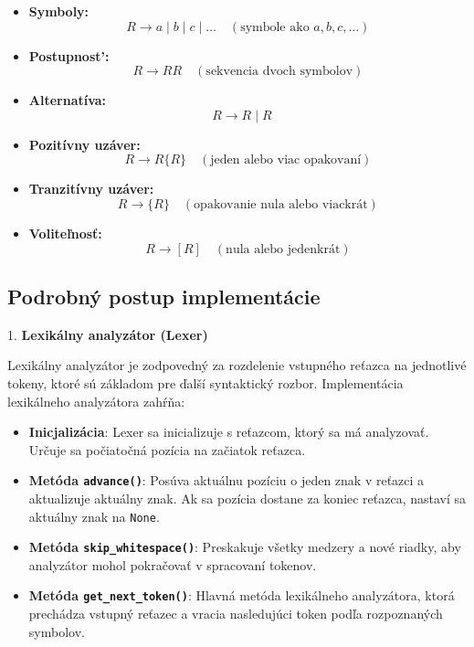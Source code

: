 \documentclass[a4paper,12pt]{article}
\begin{document}
\begin{itemize}
    \item \textbf{Symboly:} 
    \begin{equation*}
        R \rightarrow a \mid b \mid c \mid \dots \quad (\text{symbole ako } a, b, c, \dots)
    \end{equation*}
    \item \textbf{Postupnost':} 
    \begin{equation*}
        R \rightarrow R R \quad (\text{sekvencia dvoch symbolov})
    \end{equation*}
    \item \textbf{Alternatíva:} 
    \begin{equation*}
        R \rightarrow R \mid R \quad 
    \end{equation*}
    \item \textbf{Pozitívny uzáver:} 
    \begin{equation*}
        R \rightarrow R\{R\} \quad (\text{jeden alebo viac opakovaní}) 
    \end{equation*}
    \item \textbf{Tranzitívny uzáver:} 
    \begin{equation*}
        R \rightarrow \{R\} \quad (\text{opakovanie nula alebo viackrát}) 
    \end{equation*}
    \item \textbf{Voliteľnosť:}
    \begin{equation*}
        R \rightarrow [R] \quad (\text{nula alebo jedenkrát})
    \end{equation*}
\end{itemize}

\subsection{Podrobný postup implementácie}
1. \textbf{Lexikálny analyzátor (Lexer)}

Lexikálny analyzátor je zodpovedný za rozdelenie vstupného reťazca na jednotlivé tokeny, ktoré sú základom pre ďalší syntaktický rozbor. Implementácia lexikálneho analyzátora zahŕňa:

\begin{itemize}
    \item \textbf{Inicjalizácia}: Lexer sa inicializuje s reťazcom, ktorý sa má analyzovať. Určuje sa počiatočná pozícia na začiatok reťazca.
    \item \textbf{Metóda \texttt{advance()}}: Posúva aktuálnu pozíciu o jeden znak v reťazci a aktualizuje aktuálny znak. Ak sa pozícia dostane za koniec reťazca, nastaví sa aktuálny znak na \texttt{None}.
    \item \textbf{Metóda \texttt{skip\_whitespace()}}: Preskakuje všetky medzery a nové riadky, aby analyzátor mohol pokračovať v spracovaní tokenov.
    \item \textbf{Metóda \texttt{get\_next\_token()}}: Hlavná metóda lexikálneho analyzátora, ktorá prechádza vstupný reťazec a vracia nasledujúci token podľa rozpoznaných symbolov.
\end{itemize}
\end{document}
